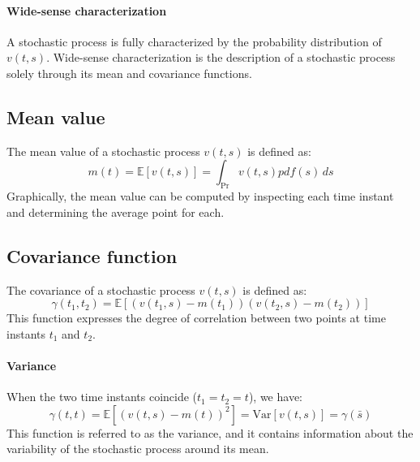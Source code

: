 \paragraph*{Wide-sense characterization}
A stochastic process is fully characterized by the probability distribution of $v(t,s)$.
 Wide-sense characterization is the description of a stochastic process solely through its mean and covariance functions.

\subsection{Mean value}
The mean value of a stochastic process $v(t,s)$ is defined as:
\[m(t)=\mathbb{E}\left[ v(t,s) \right]=\int_{\Pr}v(t,s)pdf(s)\,ds\]
Graphically, the mean value can be computed by inspecting each time instant and determining the average point for each.

\subsection{Covariance function}
The covariance of a stochastic process $v(t,s)$ is defined as:
\[\gamma(t_1,t_2)=\mathbb{E}\left[ \left(v(t_1,s)-m(t_1)\right)\left(v(t_2,s)-m(t_2)\right) \right]\]
This function expresses the degree of correlation between two points at time instants $t_1$ and $t_2$.

\paragraph*{Variance}
When the two time instants coincide ($t_1=t_2=t$), we have:
\[\gamma(t,t)=\mathbb{E}\left[ {\left(v(t,s)-m(t)\right)}^2 \right] =\text{Var}\left[v(t,s)\right]=\gamma(\bar{s})\]
This function is referred to as the variance, and it contains information about the variability of the stochastic process around its mean.